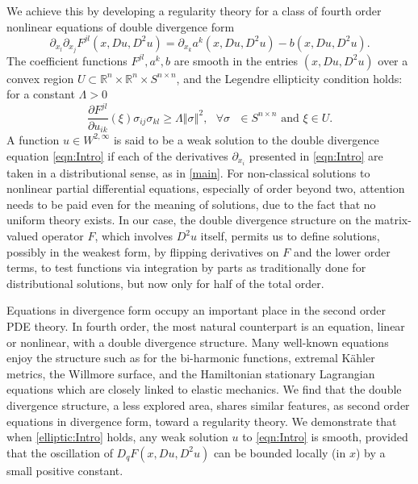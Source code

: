 \documentclass[12pt,leqno]{amsart}%
\theoremstyle{plain}
\numberwithin{equation}{section}
\theoremstyle{definition}
\begin{document}
We achieve this by developing a regularity theory for a class of fourth order
nonlinear equations of double divergence form
\begin{equation}
\label{eqn:Intro}\partial_{x_{l}} \partial_{x_{j}}F^{jl}(x,Du,D^{2}u) =
\partial_{x_{k}} a^{k}(x,Du,D^{2}u)-b(x,Du,D^{2}u).
\end{equation}
The coefficient functions $F^{jl},a^{k},b$ are smooth in the entries
$(x,Du,D^{2}u)$ over a convex region $U\subset\mathbb{R}^{n}\times
\mathbb{R}^{n}\times S^{n\times n}$, and the Legendre ellipticity condition
holds: for a constant $\Lambda>0$
\begin{equation}
\label{elliptic:Intro}\frac{\partial F^{jl}}{\partial u_{ik}}(\xi)\sigma
_{ij}\sigma_{kl}\geq\Lambda\left\Vert \sigma\right\Vert ^{2},\text{ $\forall$
}\sigma\text{ $\in S^{n\times n}$ and $\xi\in U$}.
\end{equation}
A function $u\in W^{2,\infty}$ is said to be a weak solution to the double
divergence equation \eqref{eqn:Intro} if each of the derivatives
$\partial_{x_{i}}$ presented in \eqref{eqn:Intro} are taken in a
distributional sense, as in \eqref{main}. For non-classical solutions to
nonlinear partial differential equations, especially of order beyond two,
attention needs to be paid even for the meaning of solutions, due to the fact
that no uniform theory exists. In our case, the double divergence structure on
the matrix-valued operator $F$, which involves $D^{2}u$ itself, permits us to
define solutions, possibly in the weakest form, by flipping derivatives on $F$
and the lower order terms, to test functions via integration by parts as
traditionally done for distributional solutions, but now only for half of the
total order.

Equations in divergence form occupy an important place in the second order
PDE theory. In fourth order, the most natural counterpart is an equation, linear or nonlinear, with a double divergence structure. Many well-known equations enjoy the structure such as for the bi-harmonic functions, extremal K\"ahler metrics, the Willmore surface, and the Hamiltonian stationary Lagrangian equations which are closely linked to elastic mechanics. We find that the double divergence structure, a less explored area, shares similar features, as second order equations in divergence form, toward a regularity theory. We demonstrate that when
\eqref{elliptic:Intro} holds, any weak solution $u$ to \eqref{eqn:Intro} is
smooth, provided that the oscillation of $D_{q}F(x,Du,D^{2}u)$ can be bounded
locally (in $x$) by a small positive constant.
\end{document}
